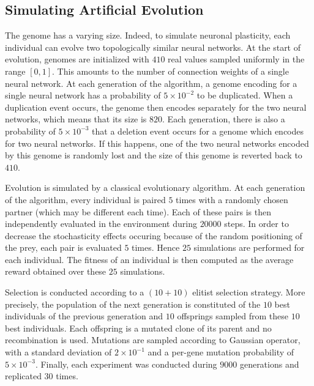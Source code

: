   \subsection*{Simulating Artificial Evolution}
    The genome has a varying size. Indeed, to simulate neuronal plasticity, each individual can evolve two topologically similar neural networks. At the start of evolution, genomes are initialized with $410$ real values sampled uniformly in the range \([0,1]\). This amounts to the number of connection weights of a single neural network. At each generation of the algorithm, a genome encoding for a single neural network has a probability of \(5 \times 10^{-2}\) to be duplicated. When a duplication event occurs, the genome then encodes separately for the two neural networks, which means that its size is $820$. Each generation, there is also a probability of \(5 \times 10^{-3}\) that a deletion event occurs for a genome which encodes for two neural networks. If this happens, one of the two neural networks encoded by this genome is randomly lost and the size of this genome is reverted back to $410$.

    Evolution is simulated by a classical evolutionary algorithm. At each generation of the algorithm, every individual is paired $5$ times with a randomly chosen partner (which may be different each time). Each of these pairs is then independently evaluated in the environment during $20000$ steps. In order to decrease the stochasticity effects occuring because of the random positioning of the prey, each pair is evaluated $5$ times. Hence $25$ simulations are performed for each individual. The fitness of an individual is then computed as the average reward obtained over these $25$ simulations.

    Selection is conducted according to a \((10 + 10)\) elitist selection strategy. More precisely, the population of the next generation is constituted of the $10$ best individuals of the previous generation and $10$ offsprings sampled from these $10$ best individuals. Each offspring is a mutated clone of its parent and no recombination is used. Mutations are sampled according to Gaussian operator, with a standard deviation of \(2 \times 10^{-1}\) and a per-gene mutation probability of \(5 \times 10^{-3}\). Finally, each experiment was conducted during $9000$ generations and replicated $30$ times.